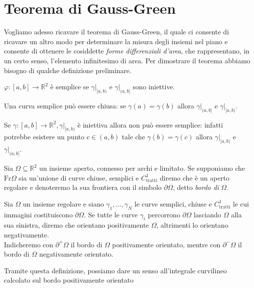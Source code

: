 \section{Teorema di Gauss-Green}
Vogliamo adesso ricavare il teorema di Gauss-Green, il quale ci consente di ricavare un altro modo per determinare la misura degli insiemi nel piano e consente di ottenere le cosiddette \emph{forme differenziali d'area}, che rappresentano, in un certo senso, l'elemento infinitesimo di area. Per dimostrare il teorema
abbiamo bisogno di qualche definizione preliminare.
\begin{theorem}
	$\varphi: [a, b] \to \mathbb{R}^2$ è semplice se $\gamma|_{[a, b)}$ e $\gamma|_{(a, b]}$ sono iniettive.
\end{theorem}
\begin{remark}
	Una curva semplice può essere chiusa: se $\gamma(a) = \gamma(b)$ allora $\gamma|_{(a, b]}$ e $\gamma|_{[a, b)}$.
\end{remark}
\begin{remark}
	Se $\gamma: [a, b] \to \mathbb{R}^2, \gamma|_{[a, b)}$ è iniettiva allora non può essere semplice: infatti potrebbe esistere un punto $c \in (a, b)$ tale che
	$\gamma(b) = \gamma(c)$ allora $\gamma|_{[a, b)}$ e $\gamma|_{(a, b]}$.
\end{remark}
\begin{definition}
	Sia $\Omega \subseteq \mathbb{R}^2$ un insieme aperto, connesso per archi e limitato. Se supponiamo che $\text{Fr}\Omega$ sia un'unione di curve chiuse, semplici e $C^1_\text{tratti}$ diremo che
	è un aperto regolare e denoteremo la sua frontiera con il simbolo $\partial \Omega$, detto \emph{bordo di} $\Omega$.
\end{definition}
\begin{definition}
	Sia $\Omega$ un insieme regolare e siano $\gamma_1, \ldots, \gamma_N$ le curve semplici, chiuse e $C^1_\text{tratti}$ le cui immagini costituiscono $\partial \Omega$. Se tutte le curve $\gamma_i$ percorrono
	$\partial \Omega$ lasciando $\Omega$ alla sua sinistra, diremo che orientano positivamente $\Omega$, altrimenti lo orientano negativamente. \\
	Indicheremo con $\partial^{+} \Omega$ il bordo di $\Omega$ positivamente orientato, mentre con $\partial^{-} \Omega$ il bordo di $\Omega$ negativamente orientato.
\end{definition}
Tramite questa definizione, possiamo dare un senso all'integrale curvilineo calcolato sul bordo positivamente orientato

